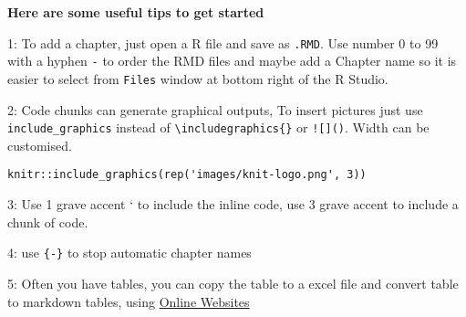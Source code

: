 \documentclass[
]{book}
\begin{document}
\textbf{Here are some useful tips to get started}

1: To add a chapter, just open a R file and save as \texttt{.RMD}. Use number 0 to 99 with a hyphen \texttt{-} to order the RMD files and maybe add a Chapter name so it is easier to select from \texttt{Files} window at bottom right of the R Studio.

2: Code chunks can generate graphical outputs, To insert pictures just use \texttt{include\_graphics} instead of \texttt{\textbackslash{}includegraphics\{\}} or \texttt{!{[}{]}()}. Width can be customised.

\begin{verbatim}
knitr::include_graphics(rep('images/knit-logo.png', 3))
\end{verbatim}

3: Use 1 grave accent ` to include the inline code, use 3 grave accent to include a chunk of code.

4: use \texttt{\{-\}} to stop automatic chapter names

5: Often you have tables, you can copy the table to a excel file and convert table to markdown tables, using \href{https://www.tablesgenerator.com/markdown_tables}{Online Websites}

  
\end{document}
